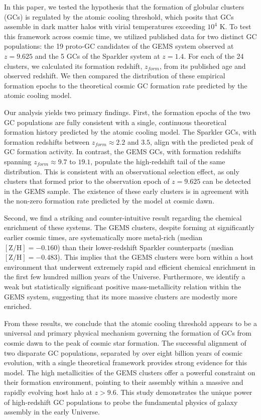 \documentclass[]{article}
\begin{document}
In this paper, we tested the hypothesis that the formation of globular clusters (GCs) is regulated by the atomic cooling threshold, which posits that GCs assemble in dark matter halos with virial temperatures exceeding $10^4$ K. To test this framework across cosmic time, we utilized published data for two distinct GC populations: the 19 proto-GC candidates of the GEMS system observed at $z=9.625$ and the 5 GCs of the Sparkler system at $z=1.4$. For each of the 24 clusters, we calculated its formation redshift, $z_{form}$, from its published age and observed redshift. We then compared the distribution of these empirical formation epochs to the theoretical cosmic GC formation rate predicted by the atomic cooling model.

Our analysis yields two primary findings. First, the formation epochs of the two GC populations are fully consistent with a single, continuous theoretical formation history predicted by the atomic cooling model. The Sparkler GCs, with formation redshifts between $z_{form} \approx 2.2$ and $3.5$, align with the predicted peak of GC formation activity. In contrast, the GEMS GCs, with formation redshifts spanning $z_{form} \approx 9.7$ to $19.1$, populate the high-redshift tail of the same distribution. This is consistent with an observational selection effect, as only clusters that formed prior to the observation epoch of $z=9.625$ can be detected in the GEMS sample. The existence of these early clusters is in agreement with the non-zero formation rate predicted by the model at cosmic dawn.

Second, we find a striking and counter-intuitive result regarding the chemical enrichment of these systems. The GEMS clusters, despite forming at significantly earlier cosmic times, are systematically more metal-rich (median $[\mathrm{Z/H}] = -0.160$) than their lower-redshift Sparkler counterparts (median $[\mathrm{Z/H}] = -0.483$). This implies that the GEMS clusters were born within a host environment that underwent extremely rapid and efficient chemical enrichment in the first few hundred million years of the Universe. Furthermore, we identify a weak but statistically significant positive mass-metallicity relation within the GEMS system, suggesting that its more massive clusters are modestly more enriched.

From these results, we conclude that the atomic cooling threshold appears to be a universal and primary physical mechanism governing the formation of GCs from cosmic dawn to the peak of cosmic star formation. The successful alignment of two disparate GC populations, separated by over eight billion years of cosmic evolution, with a single theoretical framework provides strong evidence for this model. The high metallicities of the GEMS clusters offer a powerful constraint on their formation environment, pointing to their assembly within a massive and rapidly evolving host halo at $z>9.6$. This study demonstrates the unique power of high-redshift GC populations to probe the fundamental physics of galaxy assembly in the early Universe.
\end{document}
